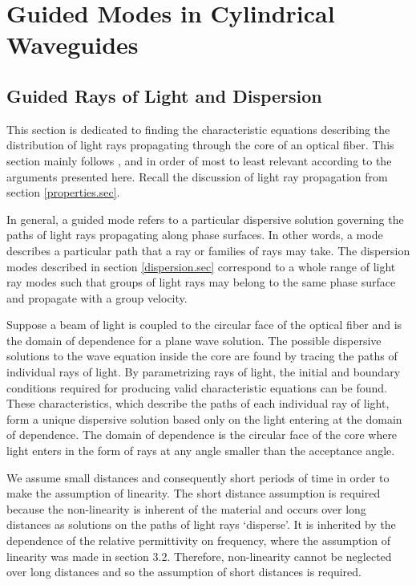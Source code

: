 \documentclass[12pt]{article}
\theoremstyle{definition}
\numberwithin{equation}{section}
\begin{document}
{\section{Guided Modes in Cylindrical Waveguides}\label{guides.sec}
\subsection{Guided Rays of Light and Dispersion}\label{lightrays.sec}
This section is dedicated to finding the characteristic equations describing the distribution of light rays propagating through the core of an optical fiber. This section mainly follows \cite{Belanger}, \cite{Okamoto} and \cite{Agrawal} in order of most to least relevant according to the arguments presented here. Recall the discussion of light ray propagation from section \ref{properties.sec}.

In general, a guided mode refers to a particular dispersive solution governing the paths of light rays propagating along phase surfaces. In other words, a mode describes a particular path that a ray or families of rays may take. The dispersion modes described in section \ref{dispersion.sec} correspond to a whole range of light ray modes such that groups of light rays may belong to the same phase surface and propagate with a group velocity. 

Suppose a beam of light is coupled to the circular face of the optical fiber and is the domain of dependence for a plane wave solution. The possible dispersive solutions to the wave equation inside the core are found by tracing the paths of individual rays of light. By parametrizing rays of light, the initial and boundary conditions required for producing valid characteristic equations can be found. These characteristics, which describe the paths of each individual ray of light, form a unique dispersive solution based only on the light entering at the domain of dependence. The domain of dependence is the circular face of the core where light enters in the form of rays at any angle smaller than the acceptance angle.

We assume small distances and consequently short periods of time in order to make the assumption of linearity. The short distance assumption is required because the non-linearity is inherent of the material and occurs over long distances as solutions on the paths of light rays `disperse'. It is inherited by the dependence of the relative permittivity on frequency, where the assumption of linearity was made in section 3.2. Therefore, non-linearity cannot be neglected over long distances and so the assumption of short distances is required. 
}
\end{document}
